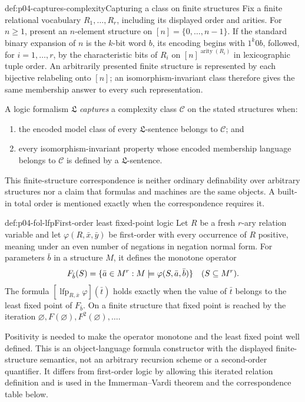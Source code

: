 \begin{hbdefinition}{def:p04-captures-complexity}{Capturing a class on finite structures}
Fix a finite relational vocabulary \(R_1,\ldots,R_r\), including its displayed
order and arities.  For \(n\geq1\), present an \(n\)-element structure on
\([n]=\{0,\ldots,n-1\}\).  If the standard binary expansion of \(n\) is the
\(k\)-bit word \(b\), its encoding begins with \(1^k0b\), followed, for
\(i=1,\ldots,r\), by the characteristic bits of \(R_i\) on
\([n]^{\operatorname{arity}(R_i)}\) in lexicographic tuple order.  An
arbitrarily presented finite structure is represented by each bijective
relabeling onto \([n]\); an isomorphism-invariant class therefore gives the
same membership answer to every such representation.

A logic formalism \(\mathfrak L\) \emph{captures} a complexity class
\(\mathcal C\) on the stated structures when:
\begin{enumerate}
 \item the encoded model class of every \(\mathfrak L\)-sentence belongs to
       \(\mathcal C\); and
 \item every isomorphism-invariant property whose encoded membership language
       belongs to \(\mathcal C\) is defined by a \(\mathfrak L\)-sentence.
\end{enumerate}
This finite-structure correspondence is neither ordinary definability over
arbitrary structures nor a claim that formulas and machines are the same
objects.  A built-in total order is mentioned exactly when the correspondence
requires it.
\end{hbdefinition}

\begin{hbdefinition}{def:p04-fol-lfp}{First-order least fixed-point logic}
Let \(R\) be a fresh \(r\)-ary relation variable and let
\(\varphi(R,\bar x,\bar y)\) be first-order with every occurrence of \(R\)
positive, meaning under an even number of negations in negation normal form.
For parameters \(\bar b\) in a structure \(M\), it defines the monotone
operator
\[
 F_{\bar b}(S)
 =\{\bar a\in M^r:M\models\varphi(S,\bar a,\bar b)\}
 \quad(S\subseteq M^r).
\]
The formula
\([\operatorname{lfp}_{R,\bar x}\varphi](\bar t)\) holds exactly when the
value of \(\bar t\) belongs to the least fixed point of \(F_{\bar b}\).  On a
finite structure that fixed point is reached by the iteration
\(\varnothing,F(\varnothing),F^2(\varnothing),\ldots\).

Positivity is needed to make the operator monotone and the least fixed point
well defined.  This is an object-language formula constructor with the
displayed finite-structure semantics, not an arbitrary recursion scheme or a
second-order quantifier.  It differs from first-order logic by allowing this
iterated relation definition and is used in the Immerman--Vardi theorem and
the correspondence table below.
\end{hbdefinition}

